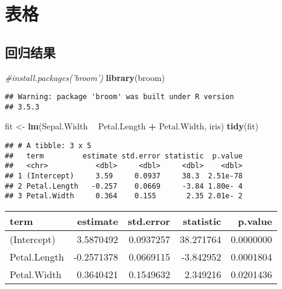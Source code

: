 \documentclass[singlesided]{Style/ucasthesis}%
\newenvironment{Shaded}{\begin{snugshade}}{\end{snugshade}}
\newcommand{\KeywordTok}[1]{\textcolor[rgb]{0.13,0.29,0.53}{\textbf{{#1}}}}
\newcommand{\StringTok}[1]{\textcolor[rgb]{0.31,0.60,0.02}{{#1}}}
\newcommand{\CommentTok}[1]{\textcolor[rgb]{0.56,0.35,0.01}{\textit{{#1}}}}
\newcommand{\OperatorTok}[1]{\textcolor[rgb]{0.81,0.36,0.00}{\textbf{{#1}}}}
\newcommand{\NormalTok}[1]{{#1}}
\begin{document}
\hypertarget{section-5}{%
\section{表格}\label{section-5}}

\hypertarget{section-6}{%
\subsection{回归结果}\label{section-6}}

\begin{Shaded}
\begin{Highlighting}[]
\CommentTok{#install.packages('broom')}
\KeywordTok{library}\NormalTok{(broom)}
\end{Highlighting}
\end{Shaded}

\begin{verbatim}
## Warning: package 'broom' was built under R version
## 3.5.3
\end{verbatim}

\begin{Shaded}
\begin{Highlighting}[]
\NormalTok{fit <-}\StringTok{ }\KeywordTok{lm}\NormalTok{(Sepal.Width }\OperatorTok{~}\StringTok{ }\NormalTok{Petal.Length }\OperatorTok{+}\StringTok{ }\NormalTok{Petal.Width, iris)}
\KeywordTok{tidy}\NormalTok{(fit)}
\end{Highlighting}
\end{Shaded}

\begin{verbatim}
## # A tibble: 3 x 5
##   term         estimate std.error statistic  p.value
##   <chr>           <dbl>     <dbl>     <dbl>    <dbl>
## 1 (Intercept)     3.59     0.0937     38.3  2.51e-78
## 2 Petal.Length   -0.257    0.0669     -3.84 1.80e- 4
## 3 Petal.Width     0.364    0.155       2.35 2.01e- 2
\end{verbatim}

\begin{tabular}{l|r|r|r|r}
\hline
term & estimate & std.error & statistic & p.value\\
\hline
(Intercept) & 3.5870492 & 0.0937257 & 38.271764 & 0.0000000\\
\hline
Petal.Length & -0.2571378 & 0.0669115 & -3.842952 & 0.0001804\\
\hline
Petal.Width & 0.3640421 & 0.1549632 & 2.349216 & 0.0201436\\
\hline
\end{tabular}
\end{document}
